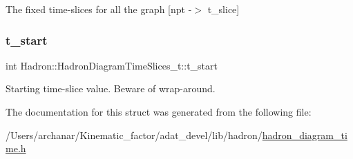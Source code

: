 The fixed time-\/slices for all the graph \mbox{[}npt -\/$>$ t\+\_\+slice\mbox{]} \mbox{\label{structHadron_1_1HadronDiagramTimeSlices__t_ace776097f7b2bb23862493b7e5621002}} 
\subsubsection{\texorpdfstring{t\_start}{t\_start}}
{\footnotesize\ttfamily int Hadron\+::\+Hadron\+Diagram\+Time\+Slices\+\_\+t\+::t\+\_\+start}

Starting time-\/slice value. Beware of wrap-\/around. 

The documentation for this struct was generated from the following file\+:\begin{DoxyCompactItemize}
\item 
/\+Users/archanar/\+Kinematic\+\_\+factor/adat\+\_\+devel/lib/hadron/\mbox{\hyperlink{lib_2hadron_2hadron__diagram__time_8h}{hadron\+\_\+diagram\+\_\+time.\+h}}\end{DoxyCompactItemize}
